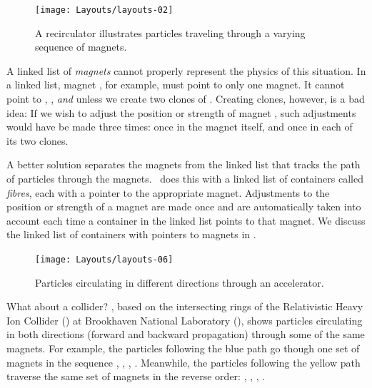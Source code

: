 \begin{figure}[ht]
  \centering
  \texttt{[image: Layouts/layouts-02]}
  \caption{A recirculator illustrates particles traveling
           through a varying sequence of magnets.}
  \label{fig:accel.CEBAF}
\end{figure}

A linked list of \emph{magnets} cannot properly represent the
physics of this situation. In a linked list, magnet ,
for example, must point to only one magnet. It cannot point to
, , \emph{and}  unless we
create two clones of . Creating clones, however, is
a bad idea: If we wish to adjust the position or strength of
magnet , such adjustments would have be made three
times: once in the magnet itself, and once in each of its two
clones.

%
A better solution separates the magnets from the linked list that
tracks the path of particles through the magnets. \PTC\ does this
with a linked list of containers called \emph{fibres}, each with
a pointer to the appropriate magnet. Adjustments to the position
or strength of a magnet are made once and are automatically taken
into account each time a container in the linked list points to
that magnet. We discuss the linked list of containers with pointers
to magnets in .

\begin{figure}[ht]
  \centering
  \texttt{[image: Layouts/layouts-06]}
  \caption{Particles circulating in different directions
           through an accelerator.}
  \label{fig:accel.RHIC}
\end{figure}

%
What about a collider? , based on the intersecting
rings of the Relativistic Heavy Ion Collider (\RHIC) at Brookhaven
National Laboratory (\BNL), shows particles circulating in both
directions (forward and backward propagation) through some of the
same magnets. For example, the particles following the blue path go
though one set of magnets in the sequence , ,
, . Meanwhile, the particles following the
yellow path traverse the same set of magnets in the reverse order:
, , , .

